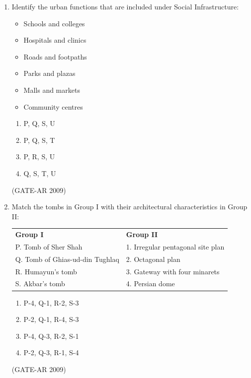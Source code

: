 \documentclass[a4paper,10pt]{article}
\begin{document}
\begin{enumerate}
    \item Identify the urban functions that are included under Social Infrastructure: 
    \begin{itemize}
        \item Schools and colleges
        \item Hospitals and clinics
        \item Roads and footpaths
        \item Parks and plazas
        \item Malls and markets
        \item Community centres
    \end{itemize}
    \begin{multicols}{4}
	\begin{enumerate}
        \item P, Q, S, U
        \item P, Q, S, T
        \item P, R, S, U
        \item Q, S, T, U
    \end{enumerate}
	\end{multicols}
    \hfill (GATE-AR 2009)

    \item Match the tombs in Group I with their architectural characteristics in Group II:  \\
    \begin{tabular}{ l l }
	\textbf{Group I} & \textbf{Group II} \\
	P. Tomb of Sher Shah & 1. Irregular pentagonal site plan \\
	Q. Tomb of Ghias-ud-din Tughlaq & 2. Octagonal plan \\
	R. Humayun’s tomb & 3. Gateway with four minarets \\
	S. Akbar’s tomb & 4. Persian dome \\
	\end{tabular}
	\begin{multicols}{2}
	\begin{enumerate}
        \item P-4, Q-1, R-2, S-3
        \item P-2, Q-1, R-4, S-3
        \item P-4, Q-3, R-2, S-1
        \item P-2, Q-3, R-1, S-4
    \end{enumerate}
	\end{multicols}
    \hfill (GATE-AR 2009)


\end{enumerate}
\end{document}
